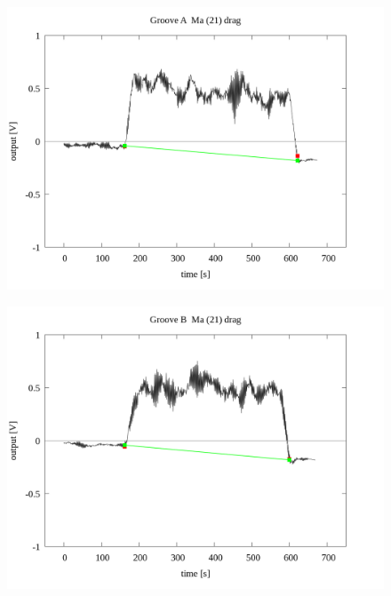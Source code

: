 \documentclass[a4paper]{jsarticle}
\begin{document}
\begin{figure}[htbp]
    \footnotesize
    \begin{center}
        \includegraphics[width=140mm]{../../../../33_result/210806/moving_average/21/drag/03/Groove_A_ma(21)_drag_03.png}
    \end{center}
\end{figure}

\begin{figure}[htbp]
    \footnotesize
    \begin{center}
        \includegraphics[width=140mm]{../../../../33_result/210806/moving_average/21/drag/03/Groove_B_ma(21)_drag_03.png}
    \end{center}
\end{figure}
\end{document}
